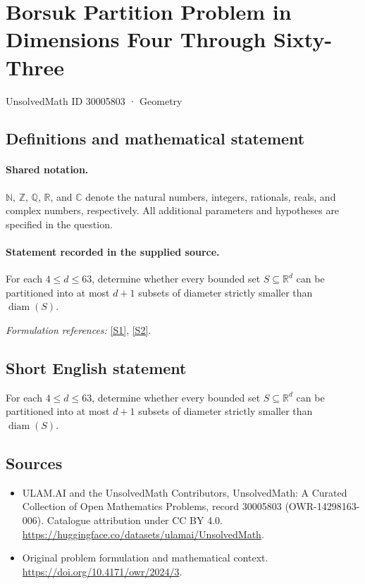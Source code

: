 \documentclass[11pt]{article}
\newcommand{\sref}[2]{\hyperlink{source:#1:#2}{[S#2]}}
\begin{document}
\setcounter{section}{30005802}
\section{Borsuk Partition Problem in Dimensions Four Through Sixty-Three}\label{30005803}
{\small UnsolvedMath ID 30005803 · Geometry}
\subsection{Definitions and mathematical statement}

\paragraph{Shared notation.}$\mathbb N$, $\mathbb Z$, $\mathbb Q$, $\mathbb R$, and $\mathbb C$ denote the natural numbers, integers, rationals, reals, and complex numbers, respectively. All additional parameters and hypotheses are specified in the question.


\paragraph{Statement recorded in the supplied source.}
For each $4\leq d\leq 63$, determine whether every bounded set $S\subseteq\mathbb R^d$ can be partitioned into at most $d+1$ subsets of diameter strictly smaller than $\operatorname{diam}(S)$.
\par\smallskip\textit{Formulation references:} \sref{30005803}{1}, \sref{30005803}{2}.
\subsection{Short English statement}
For each $4\leq d\leq 63$, determine whether every bounded set $S\subseteq\mathbb R^d$ can be partitioned into at most $d+1$ subsets of diameter strictly smaller than $\operatorname{diam}(S)$.
\subsection{Sources}
\begin{itemize}
\item[\hypertarget{source:30005803:1}{S1}] ULAM.AI and the UnsolvedMath Contributors, UnsolvedMath: A Curated Collection of Open Mathematics Problems, record 30005803 (OWR-14298163-006). Catalogue attribution under CC BY 4.0.
\url{https://huggingface.co/datasets/ulamai/UnsolvedMath}.
\item[\hypertarget{source:30005803:2}{S2}] Original problem formulation and mathematical context.
\url{https://doi.org/10.4171/owr/2024/3}.
\end{itemize}
\label{end:30005803}
\end{document}
